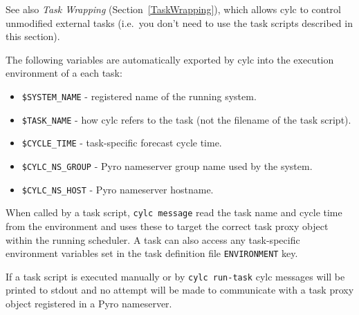 
See also {\em Task Wrapping} (Section~\ref{TaskWrapping}), which allows
cylc to control unmodified external tasks (i.e.\ you don't need to 
use the task scripts described in this section).

\lstset{language=bash}

The following variables are automatically exported by cylc into
the execution environment of a each task:
\begin{itemize}
   \item \lstinline=$SYSTEM_NAME= - registered name of the running system.
   \item \lstinline=$TASK_NAME= - how cylc refers to the task (not the
       filename of the task script). 
   \item \lstinline=$CYCLE_TIME= - task-specific forecast cycle time.
   \item \lstinline=$CYLC_NS_GROUP= - Pyro nameserver group name used by the system.
   \item \lstinline=$CYLC_NS_HOST= - Pyro nameserver hostname.
\end{itemize}

\lstset{language=bash}
When called by a task script, \lstinline=cylc message= read the task
name and cycle time from the environment and uses these to target the
correct task proxy object within the running scheduler.
\lstset{language=cylctaskdef=}
A task can also access any task-specific
environment variables set in the task definition file
\lstinline=ENVIRONMENT= key.

\lstset{language=bash}

If a task script is executed manually or by \lstinline=cylc run-task=
cylc messages will be printed to stdout and no attempt will be made to
communicate with a task proxy object registered in a Pyro nameserver.

